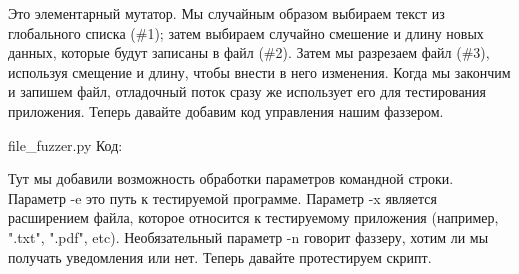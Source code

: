 \documentclass[12pt]{book}
\begin{document}



Это элементарный мутатор. Мы случайным образом выбираем текст из глобального списка (\#1); затем выбираем случайно смешение и длину новых данных, которые будут записаны в файл (\#2). Затем мы разрезаем файл (\#3), используя смещение и длину, чтобы внести в него изменения. Когда мы закончим и запишем файл, отладочный поток сразу же использует его для тестирования приложения. Теперь давайте добавим код управления нашим фаззером.

file\_fuzzer.py
Код:




    



Тут мы добавили возможность обработки параметров командной строки. Параметр -e это путь к тестируемой программе. Параметр -x является расширением файла, которое относится к тестируемому приложения (например, ".txt", ".pdf", etc). Необязательный параметр -n говорит фаззеру, хотим ли мы получать уведомления или нет. Теперь давайте протестируем скрипт.
\end{document}
